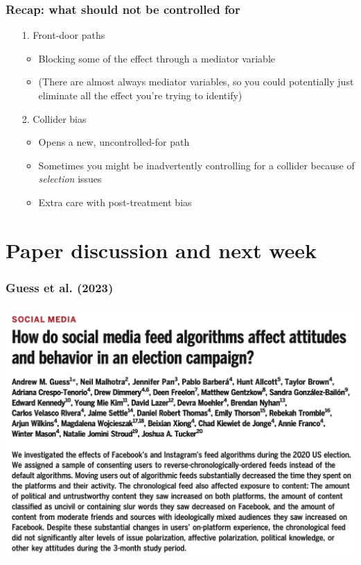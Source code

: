 \documentclass[aspectratio=43]{beamer}
\begin{document}
\begin{frame}
\frametitle{Recap: what should not be controlled for}
\centering

\begin{itemize}
  \item[1.] Front-door paths
  \begin{itemize}
    \item Blocking some of the effect through a mediator variable
    \item (There are almost always mediator variables, so you could potentially just eliminate all the effect you're trying to identify)
  \end{itemize}
  \item[]
  \item[2.] Collider bias
  \begin{itemize}
    \item Opens a new, uncontrolled-for path
    \item Sometimes you might be inadvertently controlling for a collider because of \textit{selection} issues
    \item Extra care with post-treatment bias
  \end{itemize}
\end{itemize}

\end{frame}

\section{Paper discussion and next week}

\begin{frame}
\frametitle{Guess et al. (2023)}
\centering

\includegraphics[width = \textwidth]{../img/guess2023}

\end{frame}
\end{document}
